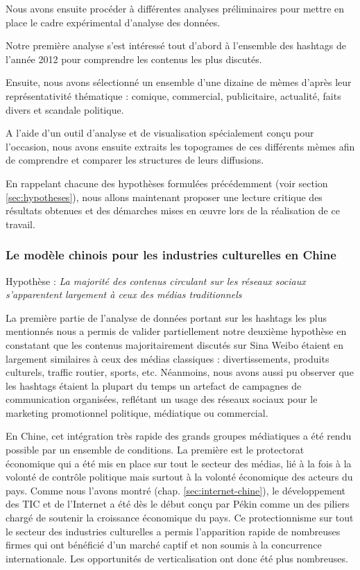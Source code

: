 Nous avons ensuite procéder à différentes analyses préliminaires pour mettre en place le cadre expérimental d'analyse des données.

Notre première analyse s{\textquoteright}est intéressé tout d{\textquoteright}abord à l{\textquoteright}ensemble des hashtags de l{\textquoteright}année 2012 pour comprendre les contenus les plus discutés. 

Ensuite, nous avons sélectionné un ensemble d{\textquoteright}une dizaine de mèmes d{\textquoteright}après leur représentativité thématique : comique, commercial, publicitaire, actualité, faits divers et scandale politique. 

A l{\textquoteright}aide d{\textquoteright}un outil d{\textquoteright}analyse et de visualisation spécialement con\c{c}u pour l{\textquoteright}occasion, nous avons ensuite extraits les topogrames de ces différents mèmes afin de comprendre et comparer les structures de leurs diffusions.


En rappelant chacune des hypothèses formulées précédemment (voir section \ref{sec:hypotheses}), nous allons maintenant proposer une lecture critique des résultats obtenues et des démarches mises en œuvre lors de la réalisation de ce travail. 

\subsubsection{Le modèle chinois pour les industries culturelles en Chine} 

Hypothèse : \textit{La majorité des contenus circulant sur les réseaux sociaux s'apparentent largement à ceux des médias traditionnels} 

La première partie de l{\textquoteright}analyse de données portant sur les hashtags les plus mentionnés nous a permis de valider partiellement notre deuxième hypothèse en constatant que les contenus majoritairement discutés sur Sina Weibo étaient en largement similaires à ceux des médias classiques : divertissements, produits culturels, traffic routier, sports, etc. Néanmoins, nous avons aussi pu observer que les hashtags étaient la plupart du temps un artefact de campagnes de communication organisées, reflétant un usage des réseaux sociaux pour le marketing promotionnel politique, médiatique ou commercial. 

En Chine, cet intégration très rapide des grands groupes médiatiques a été rendu possible par un ensemble de conditions. La première est le protectorat économique qui a été mis en place sur tout le secteur des médias, lié à la fois à la volonté de contrôle politique mais surtout à la volonté économique des acteurs du pays. Comme nous l'avons montré (chap. \ref{sec:internet-chine}), le développement des TIC et de l'Internet a été dès le début conçu par Pékin comme un des piliers chargé de soutenir la croissance économique du pays. Ce protectionnisme sur tout le secteur des industries culturelles a permis l'apparition rapide de nombreuses firmes qui ont bénéficié d'un marché captif et non soumis à la concurrence internationale. Les opportunités de verticalisation ont donc été plus nombreuses. 

